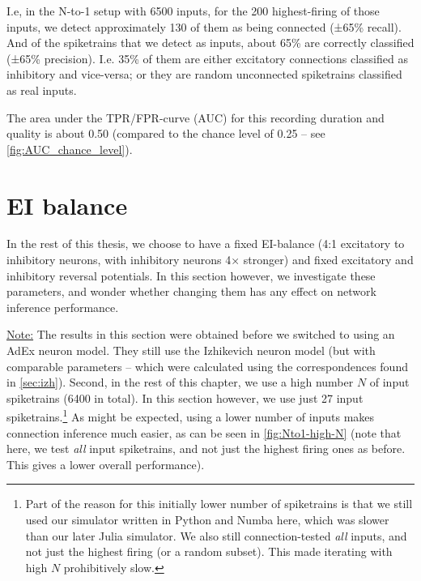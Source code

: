 I.e, in the N-to-1 setup with 6500 inputs, for the 200 highest-firing of those inputs, we detect approximately 130 of them as being connected (±65\% recall). And of the spiketrains that we detect as inputs, about 65\% are correctly classified  (±65\% precision). I.e. 35\% of them are either excitatory connections classified as inhibitory and vice-versa; or they are random unconnected spiketrains classified as real inputs.

The area under the TPR/FPR-curve (AUC) for this recording duration and quality is about 0.50 (compared to the chance level of 0.25 -- see \cref{fig:AUC_chance_level}).



\section{EI balance}

In the rest of this thesis, we choose to have a fixed EI-balance (4:1 excitatory to inhibitory neurons, with  inhibitory neurons 4× stronger) and fixed excitatory and inhibitory reversal potentials. In this section however, we investigate these parameters, and wonder whether changing them has any effect on network inference performance.


\underline{Note:} The results in this section were obtained before we switched to using an AdEx neuron model. They still use the Izhikevich neuron model (but with comparable parameters -- which were calculated using the correspondences found in \cref{sec:izh}). Second, in the rest of this chapter, we use a high number $N$ of input spiketrains (6400 in total). In this section however, we use just 27 input spiketrains.\footnote{
    Part of the reason for this initially lower number of spiketrains is that we still used our simulator written in Python and Numba here, which was slower than our later Julia simulator. We also still connection-tested \emph{all} inputs, and not just the highest firing (or a random subset). This made iterating with high $N$ prohibitively slow.
}
As might be expected, using a lower number of inputs makes connection inference much easier, as can be seen in \cref{fig:Nto1-high-N} (note that here, we test \emph{all} input spiketrains, and not just the highest firing ones as before. This gives a lower overall performance).

